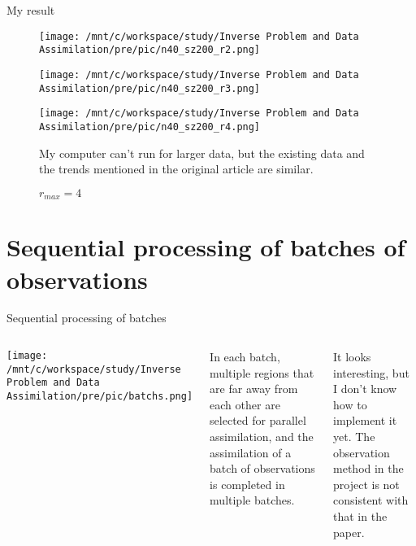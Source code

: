 \documentclass{beamer}
\begin{document}
\begin{frame}{My result}
    \begin{figure}[htbp]
    \centering
    \begin{minipage}{0.32\textwidth}
        \texttt{[image: /mnt/c/workspace/study/Inverse Problem and Data Assimilation/pre/pic/n40\_sz200\_r2.png]} %
        \caption{$r_{max}=2$}
    \end{minipage}%
    \hfill
    \begin{minipage}{0.32\textwidth}
        \texttt{[image: /mnt/c/workspace/study/Inverse Problem and Data Assimilation/pre/pic/n40\_sz200\_r3.png]} %
        \caption{$r_{max}=3$}
    \end{minipage}%
    \hfill
    \begin{minipage}{0.32\textwidth}
        \texttt{[image: /mnt/c/workspace/study/Inverse Problem and Data Assimilation/pre/pic/n40\_sz200\_r4.png]} %
        \caption{$r_{max}=4$}
    \end{minipage}
    My computer can't run for larger data, but the existing data and the trends mentioned in the original article are similar.
\end{figure}
\end{frame}
\section{Sequential processing of batches of observations}
\begin{frame}{Sequential processing of batches}
    \begin{columns}[c]
        \centering
        \texttt{[image: /mnt/c/workspace/study/Inverse Problem and Data Assimilation/pre/pic/batchs.png]} %

        In each batch, multiple regions that are far away from each other are selected for parallel assimilation, and the assimilation of a batch of observations is completed in multiple batches.

        It looks interesting, but I don’t know how to implement it yet. The observation method in the project is not consistent with that in the paper.
    \end{columns}
\end{frame}
\end{document}
